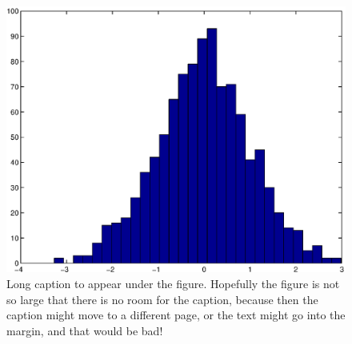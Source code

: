 \begin{landscape}
\thispagestyle{lscape}
\pagestyle{lscape}
  \begin{figure}
    \includegraphics[width=\linewidth,height=\textheight-1in]{figure.eps}
    \caption[Short caption for List of Figures]{Long caption to appear under the figure.  Hopefully the figure is not so large that there is no room for the caption, because then the caption might move to a different page, or the text might go into the margin, and that would be bad!}
  \end{figure}
\end{landscape}
